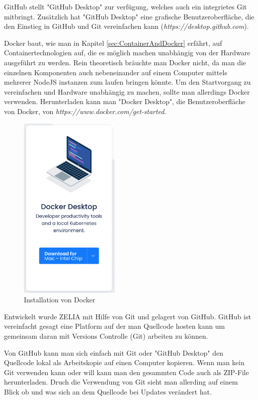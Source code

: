GitHub stellt "GitHub Desktop" zur verfügung, welches auch ein integrietes Git mitbringt. Zusätzlich hat "GitHub Desktop" eine grafische  Benutzeroberfläche, die den Einstieg in GitHub und Git vereinfachen kann (\emph{https://desktop.github.com}). 


Docker baut, wie man in Kapitel \ref{sec:ContainerAndDocker} erfährt, auf Containertechnologien auf, die es möglich machen unabhängig von der Hardware ausgeführt zu werden. Rein theoretisch bräuchte man Docker nicht, da man die einzelnen Komponenten auch nebeneinander auf einem Computer mittels mehrerer NodeJS instanzen zum laufen bringen könnte. Um den Startvorgang zu vereinfachen und Hardware unabhängig zu machen, sollte man allerdings Docker verwenden. Herunterladen kann man "Docker Desktop", die Benutzeroberfläche von Docker, von \emph{https://www.docker.com/get-started}.

\begin{figure}[H]
    \centering
    \includegraphics[height=90mm]{media/Handbuch/dockerdesktop.png}
    \caption{Installation von Docker}
\end{figure}


Entwickelt wurde ZELIA mit Hilfe von Git und gelagert von GitHub. GitHub ist vereinfacht gesagt eine Platform auf der man Quellcode hosten kann um gemeinsam daran mit Versions Controlle (Git) arbeiten zu können. 

Von GitHub kann man sich einfach mit Git oder "GitHub Desktop" den Quellcode lokal als Arbeitskopie auf einen Computer kopieren. Wenn man kein Git verwenden kann oder will kann man den gesammten Code auch als ZIP-File herunterladen. Druch die Verwendung von Git sieht man allerding auf einem Blick ob und was sich an dem Quellcode bei Updates verändert hat.

